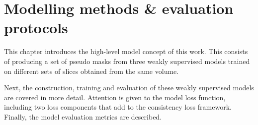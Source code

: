 
\chapter{Modelling methods \& evaluation protocols}
\par{
    This chapter introduces the high-level model concept of this work.
    This consists of producing a set of pseudo masks from three weakly supervised models trained on different sets of slices obtained from the same volume.
}
\par{
    Next, the construction, training and evaluation of these weakly supervised models are covered in more detail.
    Attention is given to the model loss function, including two loss components that add to the consistency loss framework.
    Finally, the model evaluation metrics are described.
}




\FloatBarrier



